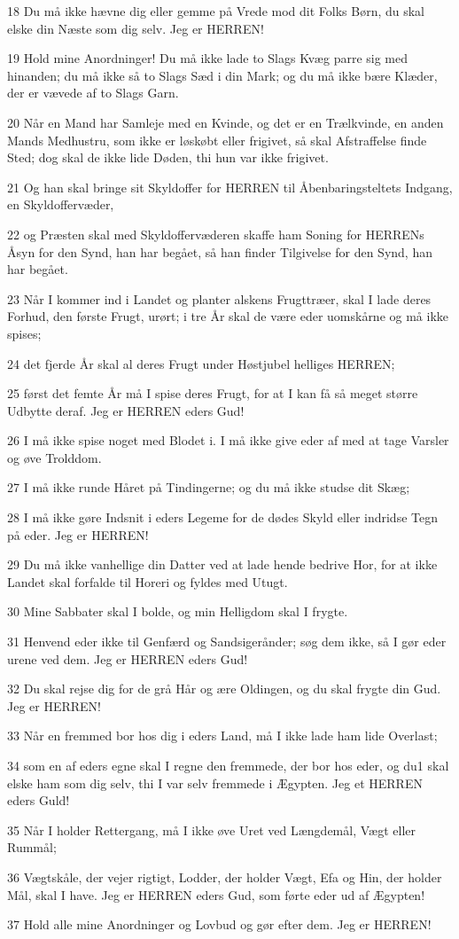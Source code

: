 \par 18 Du må ikke hævne dig eller gemme på Vrede mod dit Folks Børn, du skal elske din Næste som dig selv. Jeg er HERREN!
\par 19 Hold mine Anordninger! Du må ikke lade to Slags Kvæg parre sig med hinanden; du må ikke så to Slags Sæd i din Mark; og du må ikke bære Klæder, der er vævede af to Slags Garn.
\par 20 Når en Mand har Samleje med en Kvinde, og det er en Trælkvinde, en anden Mands Medhustru, som ikke er løskøbt eller frigivet, så skal Afstraffelse finde Sted; dog skal de ikke lide Døden, thi hun var ikke frigivet.
\par 21 Og han skal bringe sit Skyldoffer for HERREN til Åbenbaringsteltets Indgang, en Skyldoffervæder,
\par 22 og Præsten skal med Skyldoffervæderen skaffe ham Soning for HERRENs Åsyn for den Synd, han har begået, så han finder Tilgivelse for den Synd, han har begået.
\par 23 Når I kommer ind i Landet og planter alskens Frugttræer, skal I lade deres Forhud, den første Frugt, urørt; i tre År skal de være eder uomskårne og må ikke spises;
\par 24 det fjerde År skal al deres Frugt under Høstjubel helliges HERREN;
\par 25 først det femte År må I spise deres Frugt, for at I kan få så meget større Udbytte deraf. Jeg er HERREN eders Gud!
\par 26 I må ikke spise noget med Blodet i. I må ikke give eder af med at tage Varsler og øve Trolddom.
\par 27 I må ikke runde Håret på Tindingerne; og du må ikke studse dit Skæg;
\par 28 I må ikke gøre Indsnit i eders Legeme for de dødes Skyld eller indridse Tegn på eder. Jeg er HERREN!
\par 29 Du må ikke vanhellige din Datter ved at lade hende bedrive Hor, for at ikke Landet skal forfalde til Horeri og fyldes med Utugt.
\par 30 Mine Sabbater skal I bolde, og min Helligdom skal I frygte.
\par 31 Henvend eder ikke til Genfærd og Sandsigerånder; søg dem ikke, så I gør eder urene ved dem. Jeg er HERREN eders Gud!
\par 32 Du skal rejse dig for de grå Hår og ære Oldingen, og du skal frygte din Gud. Jeg er HERREN!
\par 33 Når en fremmed bor hos dig i eders Land, må I ikke lade ham lide Overlast;
\par 34 som en af eders egne skal I regne den fremmede, der bor hos eder, og du1 skal elske ham som dig selv, thi I var selv fremmede i Ægypten. Jeg et HERREN eders Guld!
\par 35 Når I holder Rettergang, må I ikke øve Uret ved Længdemål, Vægt eller Rummål;
\par 36 Vægtskåle, der vejer rigtigt, Lodder, der holder Vægt, Efa og Hin, der holder Mål, skal I have. Jeg er HERREN eders Gud, som førte eder ud af Ægypten!
\par 37 Hold alle mine Anordninger og Lovbud og gør efter dem. Jeg er HERREN!

